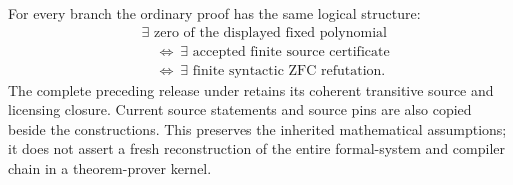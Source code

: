 For every branch the ordinary proof has the same logical structure:
\[
\begin{aligned}
 &\exists\text{ zero of the displayed fixed polynomial}\\
 &\quad\Longleftrightarrow\ \exists\text{ accepted finite source certificate}\\
 &\quad\Longleftrightarrow\ \exists\text{ finite syntactic ZFC refutation}.
\end{aligned}
\]
The complete preceding release under  retains its coherent
transitive source and licensing closure. Current source statements and source
pins are also copied beside the constructions. This preserves the inherited
mathematical assumptions; it does not assert a fresh reconstruction of the
entire formal-system and compiler chain in a theorem-prover kernel.
